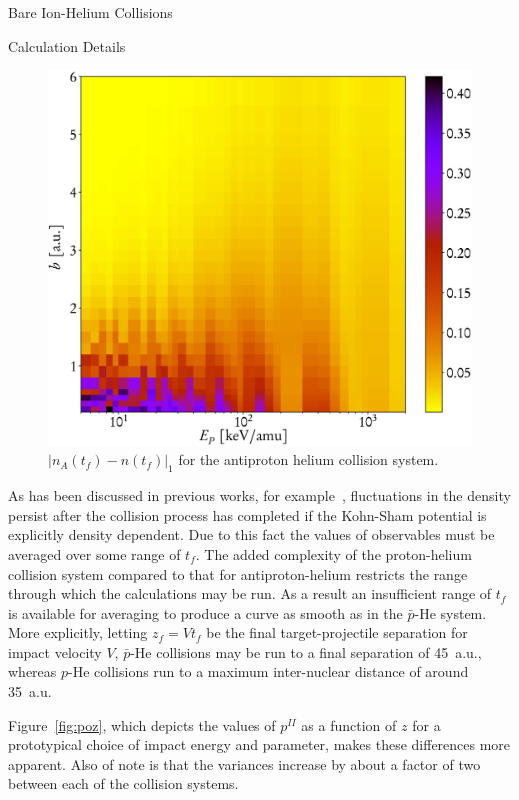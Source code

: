 \documentclass[a5paper, 9 pt]{extreport}
\begin{document}
\begin{chapter}{Bare Ion-Helium Collisions \label{chap:p-he2p-he}}
\begin{section}{Calculation Details \label{sec:phe2p-det}}
\begin{figure}[t]
\begin{minipage}{.49\linewidth}
            \centering
            \includegraphics[width = \linewidth]{./images/dendiff.eps}
            \caption[Density difference]
                   {$\left| n_A(t_f) - n (t_f)\right|_1$ for the antiproton
                    helium collision system. \label{fig:l1}}
         \end{minipage}
      \end{figure}

      As has been discussed in previous works, for example~\cite{microresp,pbarhe}, fluctuations in the
      density persist after the collision process has completed if the Kohn-Sham potential is explicitly
      density dependent. Due to this fact the values of observables must be averaged over some range of
      $t_f$. The added complexity of the proton-helium collision system compared to that for
      antiproton-helium restricts the range through which the calculations may be run. As a result
      an insufficient range of $t_f$ is available for averaging to produce a curve as smooth as in the
      $\bar{p}$-He system. More explicitly, letting $z_f = V t_f$ be the final target-projectile
      separation for impact velocity $V$, $\bar{p}$-He collisions may be run to a final separation of
      45~a.u., whereas $p$-He collisions run to a maximum inter-nuclear distance of around 35~a.u.

      Figure~\ref{fig:poz}, which depicts the values of $p^{II}$ as a function of $z$ for a prototypical
      choice of impact energy and parameter, makes these differences more apparent. Also of note is that
      the variances increase by about a factor of two between each of the collision systems.


\end{section}
\end{chapter}
\end{document}
